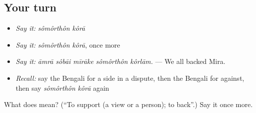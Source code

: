 \subsection*{Your turn}
\begin{itemize}
\raggedright
  \item \emph{Say it:} \emph{sômôrthôn kôrā}
  \item \emph{Say it:} \emph{sômôrthôn kôrā}, once more
  \item \emph{Say it:} \emph{āmrā sôbāi mīrāke sômôrthôn kôrlām.} — We all backed Mira.
  \item \emph{Recall:} say the Bengali for a side in a dispute, then the Bengali for against, then say \emph{sômôrthôn kôrā} again
\end{itemize}

\begin{tcolorbox}[breakable,colback=teal!4,colframe=teal!35!black,title={Before you move on}]
What does   mean? (\textquotedblleft{}To support (a view or a person); to back\textquotedblright{}.) Say it once more.
\end{tcolorbox}
